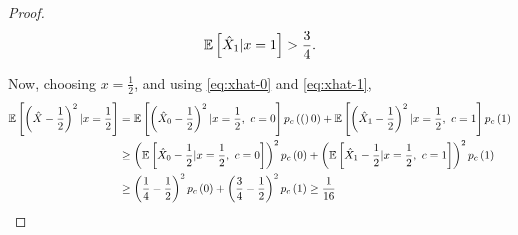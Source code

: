 \documentclass[twoside]{article}
\begin{document}
\begin{proof}
    \begin{equation}
        \mathbb{E}\left[ \hat{X}_1|x=1 \right] > \frac{3}{4}.
        \label{eq:xhat-1}
    \end{equation}

    Now, choosing \(x=\frac{1}{2}\), and using \eqref{eq:xhat-0} and \eqref{eq:xhat-1},
    \begin{align}
        \mathbb{E}\left[ \left(\hat{X}-\frac{1}{2}\right)^2|x=\frac{1}{2} \right] &= \mathbb{E}\left[ \left(\hat{X}_0 - \frac{1}{2}\right)^2|x=\frac{1}{2},\ c=0 \right]p_c\left((\right)0) + \mathbb{E}\left[ \left(\hat{X}_1-\frac{1}{2}\right)^2|x=\frac{1}{2},\ c=1 \right]p_c\left(1\right) \\
                                                          &\ge \left(\mathbb{E}\left[ \hat{X}_0-\frac{1}{2}|x=\frac{1}{2},\ c=0 \right]\right)^2p_c\left(0\right) + \left(\mathbb{E}\left[ \hat{X}_1-\frac{1}{2}|x=\frac{1}{2},\ c=1 \right]\right)^2p_c\left(1\right) \\
                                                          &\ge \left(\frac{1}{4}-\frac{1}{2}\right)^2p_c\left(0\right) + \left(\frac{3}{4}-\frac{1}{2}\right)^2p_c\left(1\right) \ge \frac{1}{16}
    \end{align}
\end{proof}
\end{document}
